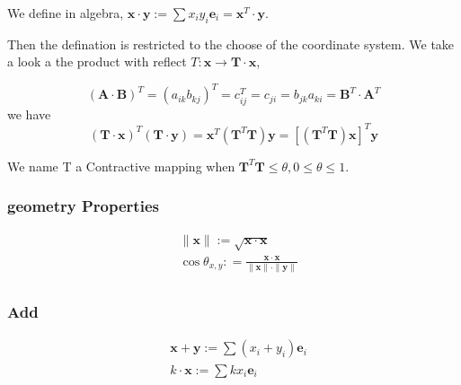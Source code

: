 We define in algebra, $ \boldsymbol{x} \cdot \boldsymbol{y} := \sum{x_iy_i\boldsymbol{e}_i} = \boldsymbol{x}^T \cdot \boldsymbol{y}$.

Then the defination is restricted to the choose of the coordinate system. We take a look a the product with reflect $T : \boldsymbol x \rightarrow  \boldsymbol{T} \cdot \boldsymbol{x}$,

\begin{equation}
    (\boldsymbol A \cdot \boldsymbol  B)^T = (a_{ik}b_{kj})^T = c_{ij}^T = c_{ji} = b_{jk}a_{ki} = \boldsymbol B^T \cdot \boldsymbol A^T
\end{equation}
we have 
\begin{equation}
    (\boldsymbol T \cdot \boldsymbol  x)^T(\boldsymbol T \cdot \boldsymbol  y) =  \boldsymbol x^T (\boldsymbol T^T \boldsymbol T) \boldsymbol y = [(\boldsymbol T^T \boldsymbol T) \boldsymbol x]^T \boldsymbol y
\end{equation}

We name T a Contractive mapping when $\boldsymbol T^T \boldsymbol T \leqslant   \theta, 0 \leqslant \theta \leqslant 1$.

\subsubsection{geometry Properties}

\begin{equation}
    \begin{split}
    &\parallel \boldsymbol{x} \parallel := \sqrt{\boldsymbol x \cdot \boldsymbol x}\\
    &\cos {\theta_{x,y}} : = \frac
    {\boldsymbol x \cdot \boldsymbol x}
    {\parallel \boldsymbol{x} \parallel \cdot \parallel \boldsymbol{y} \parallel}\\
\end{split}
\end{equation}

\subsubsection{Add}

\begin{equation}
    \begin{split}
    & \boldsymbol x + \boldsymbol y := \sum (x_i + y_i)\boldsymbol e_i\\
    & k \cdot \boldsymbol x := \sum kx_i\boldsymbol e_i\\
\end{split}
\end{equation}

